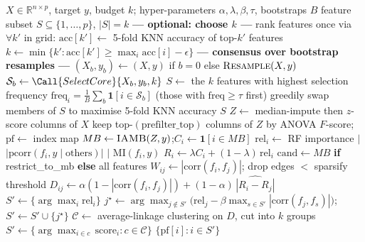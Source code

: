 \begin{algorithm}[t]
\caption{Causality-Aware Stable Hierarchical Feature Selection}
\label{alg:cahfs}
\begin{algorithmic}[1]
\Require $X\in\mathbb{R}^{n\times p}$, target $y$, budget $k$;
         hyper-parameters $\alpha,\lambda,\beta,\tau$, bootstraps $B$
\Ensure  feature subset $S\subseteq\{1,\dots,p\}$, $|S|=k$
\Statex \textbf{--- optional: choose $k$ ---}
  \State rank features once via 
  \State $\forall k'$ in grid: $\mathrm{acc}[k']\gets$ 5-fold KNN accuracy of top-$k'$ features
  \State $k\gets \min\{k' : \mathrm{acc}[k']\ge \max_i\mathrm{acc}[i]-\epsilon\}$ 
\EndIf
\Statex \textbf{--- consensus over bootstrap resamples ---}
 
  \State $(X_b,y_b)\gets (X,y)$ if $b{=}0$ else $\textsc{Resample}(X,y)$
  \State $\mathcal{S}_b\gets \Call{SelectCore}{X_b,y_b,k}$
\EndFor
\State $S\gets$ the $k$ features with highest selection frequency
       $\mathrm{freq}_i=\tfrac1B\sum_b \mathbf{1}[i\in\mathcal{S}_b]$ (those with $\mathrm{freq}\ge\tau$ first)
  \State greedily swap members of $S$ to maximise 5-fold KNN accuracy
\EndIf
\State \Return $S$
\Statex
{}
  \State $Z\gets$ median-impute then $z$-score columns of $X$ 
    \State keep top-$(\text{prefilter\_top})$ columns of $Z$ by ANOVA $F$-score;
           $\mathrm{pf}\gets$ index map
  \EndIf
  \State $MB\gets \textsc{IAMB}(Z,y)$;\quad $C_i\gets\mathbf{1}[i\in MB]$ 
  \State $\mathrm{rel}_i\gets$ RF importance $\mid$ $|\mathrm{pcorr}(f_i,y\mid\text{others})|$ $\mid$ $\mathrm{MI}(f_i,y)$
  \State $R_i\gets \lambda C_i+(1-\lambda)\,\mathrm{rel}_i$
  \State $\mathrm{cand}\gets MB$ \textbf{if} restrict\_to\_mb \textbf{else} all features
  \State $W_{ij}\gets|\mathrm{corr}(f_i,f_j)|$; drop edges $<$ sparsify threshold
  \State $D_{ij}\gets \alpha(1-|\mathrm{corr}(f_i,f_j)|)+(1-\alpha)\,\widehat{|R_i-R_j|}$
   
    \State $S'\gets\{\arg\max_i \mathrm{rel}_i\}$
      \State $j^\star\gets\arg\max_{j\notin S'}\big(\mathrm{rel}_j-\beta\max_{s\in S'}|\mathrm{corr}(f_j,f_s)|\big)$;\quad $S'\gets S'\cup\{j^\star\}$
    \EndWhile
  \Else {}
    \State $\mathcal{C}\gets$ average-linkage clustering on $D$, cut into $k$ groups
    \State $S'\gets\{\arg\max_{i\in c}\,\mathrm{score}_i : c\in\mathcal{C}\}$
  \EndIf
  \State \Return $\{\mathrm{pf}[i] : i\in S'\}$ 
\EndFunction
\end{algorithmic}
\end{algorithm}
